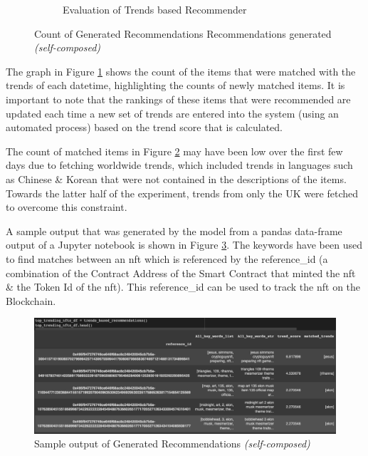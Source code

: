 \documentclass[manuscript,natbib=false]{acmart}
\begin{document}
\begin{figure}[h]
\begin{subfigure}[b]{0.47\linewidth}
         \caption{Evaluation of Trends based Recommender}
         \label{fig:trends-recsys-new-matches}
     \end{subfigure}
     \hfill
        \caption{Count of Generated Recommendations Recommendations generated \textit{(self-composed)}}
        \label{fig:counts-of-matches}
\end{figure}

The graph in Figure \ref{fig:trends-recsys-new-matches} shows the count of the items that were matched with the trends of each datetime, highlighting the counts of newly matched items. It is important to note that the rankings of these items that were recommended are updated each time a new set of trends are entered into the system (using an automated process) based on the trend score that is calculated.

The count of matched items in Figure \ref{fig:counts-of-matches} may have been low over the first few days due to fetching worldwide trends, which included trends in languages such as Chinese \& Korean that were not contained in the descriptions of the items. Towards the latter half of the experiment, trends from only the UK were fetched to overcome this constraint.


A sample output that was generated by the model from a pandas data-frame output of a Jupyter notebook is shown in Figure \ref{fig:trends-recsys-sample-output}. The keywords have been used to find matches between an \gls{nft} which is referenced by the reference\_id (a combination of the Contract Address of the Smart Contract \cite{IntroductionSmartContracts} that minted the \gls{nft} \& the Token Id of the \gls{nft}). This reference\_id can be used to track the \gls{nft} on the Blockchain.
\begin{figure}[h]
\centering
\includegraphics[width=\linewidth]{images/trends_rec-output.png}
\caption{Sample output of Generated Recommendations \textit{(self-composed)}}
\label{fig:trends-recsys-sample-output}
\end{figure}
\end{document}
